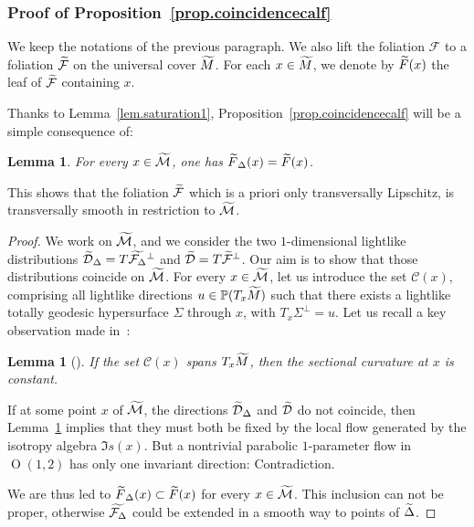 \documentclass[11pt]{article}
\newtheorem{lemm}[theo]{Lemma}
\theoremstyle{definition}
\numberwithin{equation}{section}
\numberwithin{figure}{section}
\numberwithin{table}{section}
\DeclareMathOperator{\Omp}{O}%
\newcommand{\calf}{\mathcal{F}}
\newcommand{\tcalm}{\tilde{\mathcal{M}}}
\newcommand{\tm}{\tilde{{M}}}
\newcommand{\tcalf}{\tilde{{\mathcal{F}}}}
\newcommand{\tFd}{\tilde{{F}}_{\Delta}}
\newcommand{\tF}{\tilde{{F}}}
\newcommand{\tcalfd}{\tilde{{\mathcal{F}_{\Delta}}}}
\newcommand{\tcald}{\tilde{{\mathcal{D}}}}
\let\oldtilde\tilde
\renewcommand*\tilde[1]{\mathchoice{\widetilde{#1}}{\widetilde{#1}}{\widetilde{#1}}{\oldtilde{#1}}}
\begin{document}
\subsubsection{Proof of Proposition~\ref{prop.coincidencecalf}}

We keep the notations of the previous paragraph. We also lift the foliation $\calf$ to a foliation $\tcalf$ on the universal cover $\tm$. For each $x \in \tm$, we denote by $\tF(x)$ the leaf of $\tcalf$ containing $x$.

Thanks to Lemma~\ref{lem.saturation1}, Proposition~\ref{prop.coincidencecalf} will be a simple consequence of:

\begin{lemm}\label{lem.saturation2}
For every $x \in \tcalm$, one has $\tFd(x)= \tF(x)$.
\end{lemm}

This shows that the foliation $\tcalf$ which is a priori only transversally Lipschitz, is transversally smooth in restriction to $\tcalm$.


\begin{proof}
We work on $\tcalm$, and we consider the two $1$-dimensional lightlike distributions $\tcald_{\Delta}=T\tcalfd^{\perp}$ and $\tcald=T\tcalf^{\perp}$. Our aim is to show that those distributions coincide on $\tcalm$. For every $x \in \tcalm$, let us introduce the set ${\mathcal C}(x)$, comprising all lightlike directions $u \in {\mathbb P}(T_x\tm)$ such that there exists a lightlike totally geodesic hypersurface $\Sigma$ through $x$, with $T_x\Sigma^{\perp}=u$. Let us recall a key observation made in~\cite{zeghibisom2}:

\begin{lemm}[{\cite[Proposition~2.4]{zeghibisom2}}]\label{lem.sec.curvature}
If the set ${\mathcal C}(x)$ spans $T_x\tm$, then the sectional curvature at $x$ is constant.
\end{lemm}

If at some point $x$ of $\tcalm$, the directions $\tcald_{\Delta}$ and $\tcald$ do not coincide, then Lemma~\ref{lem.sec.curvature} implies that they must both be fixed by the local flow generated by the isotropy algebra ${\mathfrak Is}(x)$. But a nontrivial parabolic $1$-parameter flow in $\Omp(1,2)$ has only one invariant direction: Contradiction.


We are thus led to $\tFd(x) \subset \tF(x)$ for every $x \in \tcalm$. This inclusion can not be proper, otherwise $\tcalfd$ could be extended in a smooth way to points of $\tilde{\Delta}$.
\end{proof}
\end{document}
